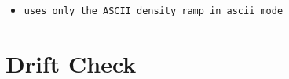 \begin{itemize}
\item
  \texttt{u\allowbreak{}s\allowbreak{}e\allowbreak{}s\allowbreak{} \allowbreak{}o\allowbreak{}n\allowbreak{}l\allowbreak{}y\allowbreak{} \allowbreak{}t\allowbreak{}h\allowbreak{}e\allowbreak{} \allowbreak{}A\allowbreak{}S\allowbreak{}C\allowbreak{}I\allowbreak{}I\allowbreak{} \allowbreak{}d\allowbreak{}e\allowbreak{}n\allowbreak{}s\allowbreak{}i\allowbreak{}t\allowbreak{}y\allowbreak{} \allowbreak{}r\allowbreak{}a\allowbreak{}m\allowbreak{}p\allowbreak{} \allowbreak{}i\allowbreak{}n\allowbreak{} \allowbreak{}a\allowbreak{}s\allowbreak{}c\allowbreak{}i\allowbreak{}i\allowbreak{} \allowbreak{}m\allowbreak{}o\allowbreak{}d\allowbreak{}e}
\end{itemize}

\section{Drift Check}\label{record-160-drift-check}

